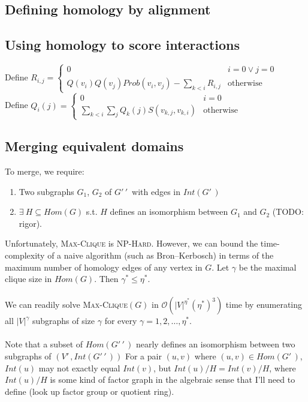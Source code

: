 \documentclass[11pt]{article}
\begin{document}
\subsection*{Defining homology by alignment}

\subsection*{Using homology to score interactions}

Define
\(
R_{i,j} = 
\left\{ \begin{array}{ll}
0 & i=0 \vee j=0\\
Q(v_i)Q(v_j)Prob(v_i,v_j) - \displaystyle \sum_{k < i} R_{i,j} & \text{otherwise}
\end{array} \right.
\)\\
Define
\(
Q_i(j) = 
\left\{ \begin{array}{ll}
0 & i=0\\
\displaystyle \sum_{k < i} \sum_j Q_k(j) S(v_{k,j}, v_{k,i}) & \text{otherwise}
\end{array} \right.
\)\\

\subsection*{Merging equivalent domains}

To merge, we require:
\begin{enumerate}
\item Two subgraphs $G_1$, $G_2$ of $G'\,\!'\,\!$ with edges in $Int(G'\,\!)$
\item $\exists \: H \subseteq Hom(G)$ s.t. $H$ defines an isomorphism between $G_1$ and $G_2$ (TODO: rigor).
\end{enumerate}
Unfortunately, \textsc{Max-Clique} is \textsc{NP-Hard}. However, we can bound the time-complexity of a naive algorithm (such as Bron--Kerbosch) in terms of the maximum number of homology edges of any vertex in $G$. Let $\gamma$ be the maximal clique size in $Hom(G)$. Then $\gamma^* \leq \eta^*$.\\\\
We can readily solve \textsc{Max-Clique}$(G)$ in $\mathcal O(|V|^{\eta^*}(\eta^*)^3)$ time by enumerating all $|V|^{\gamma}$ subgraphs of size $\gamma$ for every $\gamma = 1, 2, \ldots, \eta^*$.\\\\
Note that a subset of $Hom(G'\,\!'\,\!)$ nearly defines an isomorphism between two subgraphs of $(V'\,\!, Int(G'\,\!'\,\!))$ For a pair $(u,v)$ where $(u,v) \in Hom(G'\,\!)$, $Int(u)$ may not exactly equal $Int(v)$, but $Int(u) / H = Int(v) / H$, where $Int(u) / H$ is some kind of factor graph in the algebraic sense that I'll need to define (look up factor group or quotient ring).
\end{document}
